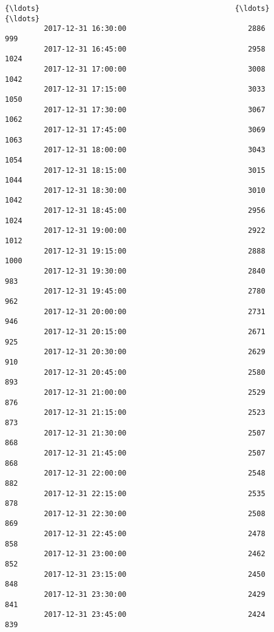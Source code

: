 \documentclass[11pt]{article}
\begin{document}
\begin{Verbatim}[commandchars=\\\{\}]
         {\ldots}                                             {\ldots}                {\ldots}   
         2017-12-31 16:30:00                            2886                999   
         2017-12-31 16:45:00                            2958               1024   
         2017-12-31 17:00:00                            3008               1042   
         2017-12-31 17:15:00                            3033               1050   
         2017-12-31 17:30:00                            3067               1062   
         2017-12-31 17:45:00                            3069               1063   
         2017-12-31 18:00:00                            3043               1054   
         2017-12-31 18:15:00                            3015               1044   
         2017-12-31 18:30:00                            3010               1042   
         2017-12-31 18:45:00                            2956               1024   
         2017-12-31 19:00:00                            2922               1012   
         2017-12-31 19:15:00                            2888               1000   
         2017-12-31 19:30:00                            2840                983   
         2017-12-31 19:45:00                            2780                962   
         2017-12-31 20:00:00                            2731                946   
         2017-12-31 20:15:00                            2671                925   
         2017-12-31 20:30:00                            2629                910   
         2017-12-31 20:45:00                            2580                893   
         2017-12-31 21:00:00                            2529                876   
         2017-12-31 21:15:00                            2523                873   
         2017-12-31 21:30:00                            2507                868   
         2017-12-31 21:45:00                            2507                868   
         2017-12-31 22:00:00                            2548                882   
         2017-12-31 22:15:00                            2535                878   
         2017-12-31 22:30:00                            2508                869   
         2017-12-31 22:45:00                            2478                858   
         2017-12-31 23:00:00                            2462                852   
         2017-12-31 23:15:00                            2450                848   
         2017-12-31 23:30:00                            2429                841   
         2017-12-31 23:45:00                            2424                839   
         

\end{Verbatim}
\end{document}
